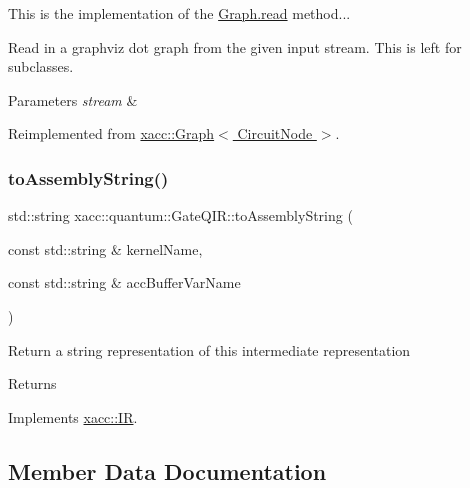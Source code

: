 This is the implementation of the \hyperlink{a02528_abdd3e67dc08c223821d809bc8914164a}{Graph.\+read} method...

Read in a graphviz dot graph from the given input stream. This is left for subclasses.


\begin{DoxyParams}{Parameters}
{\em stream} & \\
\hline
\end{DoxyParams}


Reimplemented from \hyperlink{a02528_abdd3e67dc08c223821d809bc8914164a}{xacc\+::\+Graph$<$ Circuit\+Node $>$}.

\mbox{\label{a01296_a7153f7e9f516d43af3d5d4f95d60bd86}} 
\subsubsection{\texorpdfstring{to\+Assembly\+String()}{toAssemblyString()}}
{\footnotesize\ttfamily std\+::string xacc\+::quantum\+::\+Gate\+Q\+I\+R\+::to\+Assembly\+String (\begin{DoxyParamCaption}\item[{const std\+::string \&}]{kernel\+Name,  }\item[{const std\+::string \&}]{acc\+Buffer\+Var\+Name }\end{DoxyParamCaption})\hspace{0.3cm}{\ttfamily [virtual]}}

Return a string representation of this intermediate representation \begin{DoxyReturn}{Returns}

\end{DoxyReturn}


Implements \hyperlink{a02480_a8356cdff1919b88eabeb84fd7450cdb6}{xacc\+::\+IR}.



\subsection{Member Data Documentation}
\mbox{\label{a01296_ae75a4af0ce455eee1ce316c16426a661}} 

